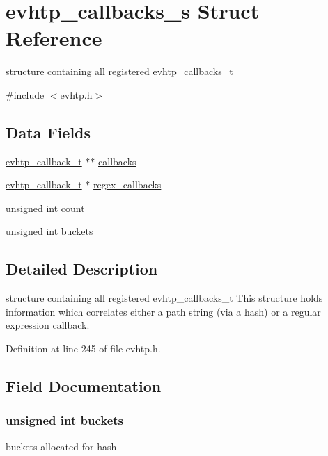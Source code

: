 \hypertarget{structevhtp__callbacks__s}{
\section{evhtp\_\-callbacks\_\-s Struct Reference}
\label{structevhtp__callbacks__s}
}


structure containing all registered evhtp\_\-callbacks\_\-t  




{\ttfamily \#include $<$evhtp.h$>$}

\subsection*{Data Fields}
\begin{DoxyCompactItemize}
\item 
\hyperlink{structevhtp__callback__s}{evhtp\_\-callback\_\-t} $\ast$$\ast$ \hyperlink{structevhtp__callbacks__s_ae41f6bd6ab77be4d8bdd1eca69aad1a5}{callbacks}
\item 
\hyperlink{structevhtp__callback__s}{evhtp\_\-callback\_\-t} $\ast$ \hyperlink{structevhtp__callbacks__s_a02e0575e2349e04a2e6c77e7d84eedcd}{regex\_\-callbacks}
\item 
unsigned int \hyperlink{structevhtp__callbacks__s_a16ff2d8e15ade4948398b0aeb80124a8}{count}
\item 
unsigned int \hyperlink{structevhtp__callbacks__s_aedff83072c3ab4f3719e66edc63610d8}{buckets}
\end{DoxyCompactItemize}


\subsection{Detailed Description}
structure containing all registered evhtp\_\-callbacks\_\-t This structure holds information which correlates either a path string (via a hash) or a regular expression callback. 

Definition at line 245 of file evhtp.h.



\subsection{Field Documentation}
\hypertarget{structevhtp__callbacks__s_aedff83072c3ab4f3719e66edc63610d8}{
\subsubsection[{buckets}]{\setlength{\rightskip}{0pt plus 5cm}unsigned int {\bf buckets}}}
\label{structevhtp__callbacks__s_aedff83072c3ab4f3719e66edc63610d8}
buckets allocated for hash 

